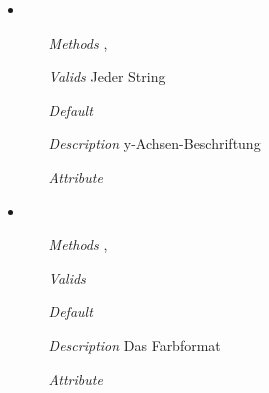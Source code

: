 \begin{itemize}
\item {}
\begin{enumerate}
\item[\textit{Methods}] ,
\item[\textit{Valids}] Jeder String
\item[\textit{Default}] 
\item[\textit{Description}] y-Achsen-Beschriftung
\item[\textit{Attribute}] 
\end{enumerate}

\item {}
\begin{enumerate}
\item[\textit{Methods}] , 
\item[\textit{Valids}] 
\item[\textit{Default}] 
\item[\textit{Description}] Das Farbformat
\item[\textit{Attribute}] 
\end{enumerate}

\end{itemize}


\newpage

